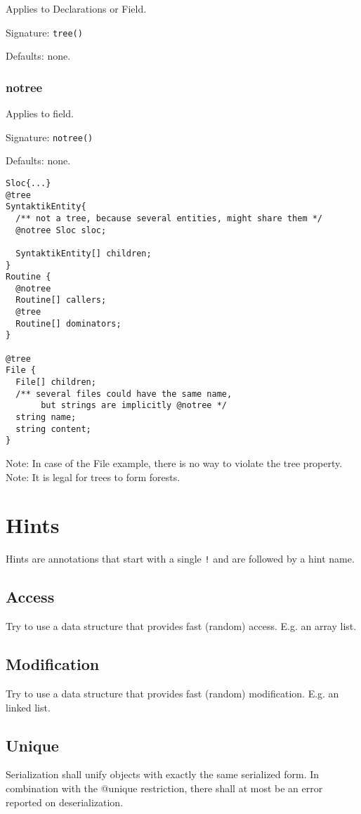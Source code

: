 \documentclass[a4paper,10pt]{article}
\begin{document}
Applies to Declarations or Field.

Signature: \verb/tree()/

Defaults: none.


\subsubsection*{notree}
Applies to field.

Signature: \verb/notree()/

Defaults: none.

\begin{lstlisting}[label=treeExample,caption=Examples,language=skill]
Sloc{...}
@tree
SyntaktikEntity{
  /** not a tree, because several entities, might share them */
  @notree Sloc sloc;
  
  SyntaktikEntity[] children;
}
Routine {
  @notree
  Routine[] callers;
  @tree
  Routine[] dominators;
}

@tree
File {
  File[] children;
  /** several files could have the same name,
       but strings are implicitly @notree */
  string name;
  string content;
} 
\end{lstlisting}
Note: In case of the File example, there is no way to violate the tree property.
Note: It is legal for trees to form forests.


\section{Hints}
\label{hints}

Hints are annotations that start with a single \verb/!/ and are followed by a hint name.

\subsection*{Access}
Try to use a data structure that provides fast (random) access. E.g. an array list.

\subsection*{Modification}
Try to use a data structure that provides fast (random) modification. E.g. an linked list.

\subsection*{Unique}
Serialization shall unify objects with exactly the same serialized form. In combination with the @unique restriction, there shall at most be an error reported on deserialization.
\end{document}
